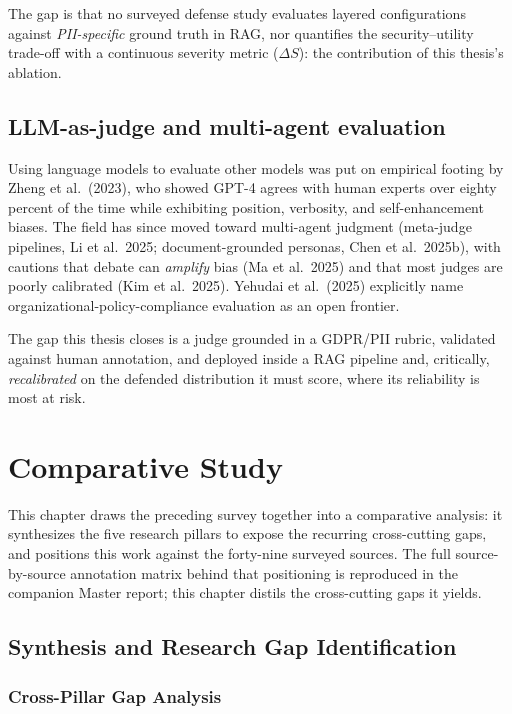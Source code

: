 \documentclass[12pt,a4paper]{report}
\begin{document}
The gap is that no surveyed defense study evaluates layered configurations against \emph{PII-specific}
ground truth in RAG, nor quantifies the security--utility trade-off with a continuous severity metric
($\Delta S$): the contribution of this thesis's ablation.

\section{LLM-as-judge and multi-agent evaluation}
\label{sec:llm-judge}

Using language models to evaluate other models was put on empirical footing by Zheng et al.\ (2023),
who showed GPT-4 agrees with human experts over eighty percent of the time while exhibiting position,
verbosity, and self-enhancement biases. The field has since moved toward multi-agent judgment
(meta-judge pipelines, Li et al.\ 2025; document-grounded personas, Chen et al.\ 2025b), with cautions
that debate can \emph{amplify} bias (Ma et al.\ 2025) and that most judges are poorly calibrated (Kim
et al.\ 2025). Yehudai et al.\ (2025) explicitly name organizational-policy-compliance evaluation as an
open frontier.

The gap this thesis closes is a judge grounded in a GDPR/PII rubric, validated against human
annotation, and deployed inside a RAG pipeline and, critically, \emph{recalibrated} on the defended
distribution it must score, where its reliability is most at risk.


\chapter{Comparative Study}
\label{ch:comparative}

This chapter draws the preceding survey together into a comparative analysis: it synthesizes the
five research pillars to expose the recurring cross-cutting gaps, and positions this work against the
forty-nine surveyed sources. The full source-by-source annotation matrix behind that positioning is
reproduced in the companion Master report; this chapter distils the cross-cutting gaps it yields.

\section{Synthesis and Research Gap Identification}
\label{sec:synthesis}

\subsection{Cross-Pillar Gap Analysis}
\end{document}
